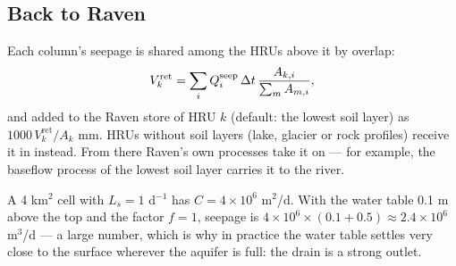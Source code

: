 \subsection{Back to Raven}
Each column's seepage is shared among the HRUs above it by overlap:
\begin{equation}
V^{\mathrm{ret}}_k=\sum_i Q^{\mathrm{seep}}_i\,\Delta t\,\frac{A_{k,i}}{\sum_{m}A_{m,i}},
\end{equation}
and added to the Raven store  of HRU $k$ (default: the lowest soil layer) as
$1000\,V^{\mathrm{ret}}_k/A_k$ mm. HRUs without soil layers (lake, glacier or rock profiles) receive it in
 instead. From there Raven's own processes take it on --- for example, the baseflow process of the
lowest soil layer carries it to the river.
\begin{example}[: seepage]
A 4 km$^2$ cell with $L_s=1$ d$^{-1}$ has $C=4\times10^6$ m$^2$/d. With the water table 0.1 m above the top and the
factor $f=1$, seepage is $4\times10^6\times(0.1+0.5)\approx2.4\times10^6$ m$^3$/d --- a large number, which is why in
practice the water table settles very close to the surface wherever the aquifer is full: the drain is a strong outlet.
\end{example}

